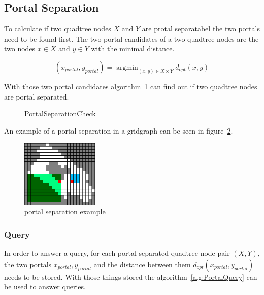\documentclass{article}
\DeclareMathOperator*{\argmin}{argmin} %
\begin{document}
\subsection{Portal Separation}
To calculate if two quadtree nodes $X$ and $Y$ are protal separatabel the two portals need to be found first.
The two portal candidates of a two quadtree nodes are the two nodes $x \in X$ and $y \in Y$ with the minimal distance.

\begin{equation}
  (x_{portal}, y_{portal}) = \argmin_{(x, y) \in X \times Y} d_{opt}(x, y)
\end{equation}

With those two portal candidates algorithm~\ref{alg:PortalSeparation} can find out if two quadtree nodes are portal separated.

\begin{figure}[ht!]
  \begin{algorithm}[H]
    \caption{PortalSeparationCheck}
    \label{alg:PortalSeparation}
  \end{algorithm}
\end{figure}

An example of a portal separation in a gridgraph can be seen in figure~\ref{pic:PortalSeparation}.

\begin{figure}[ht!]
  \centering
  \includegraphics[width=0.33\textwidth]{PortalSeparation.png}
  \caption{portal separation example}
  \label{pic:PortalSeparation}
\end{figure}


\subsubsection{Query}
In order to answer a query, for each portal separated quadtree node pair $(X, Y)$, the two portals $x_{portal}, y_{portal}$ and the distance
between them $d_{opt}(x_{portal}, y_{portal})$ needs to be stored.
With those things stored the algorithm~\ref{alg:PortalQuery} can be used to answer queries.
\end{document}
